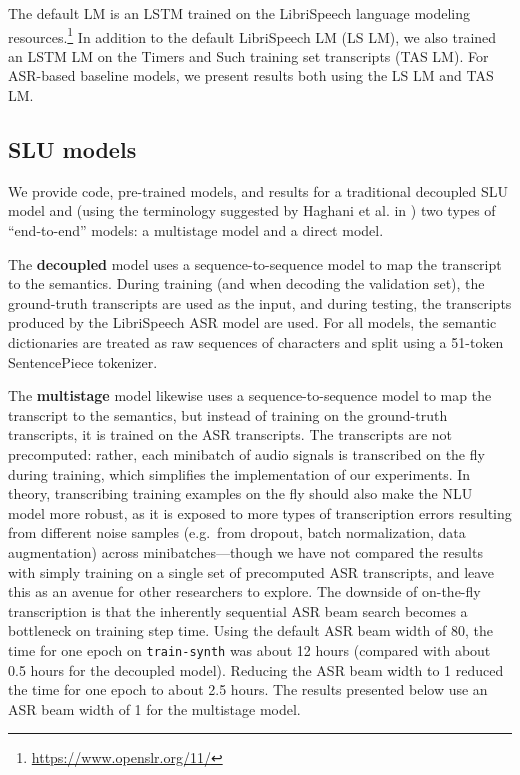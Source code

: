 \documentclass{article}
\begin{document}
The default LM is an LSTM trained on the LibriSpeech language modeling resources.\footnote{\url{https://www.openslr.org/11/}} In addition to the default LibriSpeech LM (LS LM), we also trained an LSTM LM on the Timers and Such training set transcripts (TAS LM). For ASR-based baseline models, we present results both using the LS LM and TAS LM.

\subsection{SLU models}\label{models}

We provide code, pre-trained models, and results for a traditional decoupled SLU model and (using the terminology suggested by Haghani et al. in \cite{Haghani2018}) two types of ``end-to-end'' models: a multistage model and a direct model.

The \textbf{decoupled} model uses a sequence-to-sequence model to map the transcript to the semantics. During training (and when decoding the validation set), the ground-truth transcripts are used as the input, and during testing, the transcripts produced by the LibriSpeech ASR model are used. For all models, the semantic dictionaries are treated as raw sequences of characters and split using a 51-token SentencePiece tokenizer.  

The \textbf{multistage} model likewise uses a sequence-to-sequence model to map the transcript to the semantics, but instead of training on the ground-truth transcripts, it is trained on the ASR transcripts. The transcripts are not precomputed: rather, each minibatch of audio signals is transcribed on the fly during training, which simplifies the implementation of our experiments.
In theory, transcribing training examples on the fly should also make the NLU model more robust, as it is exposed to more types of transcription errors resulting from different noise samples (e.g.~from dropout, batch normalization, data augmentation) across minibatches---though we have not compared the results with simply training on a single set of precomputed ASR transcripts, and leave this as an avenue for other researchers to explore. The downside of on-the-fly transcription is that the inherently sequential ASR beam search becomes a bottleneck on training step time. Using the default ASR beam width of 80, the time for one epoch on \texttt{train-synth} was about 12 hours (compared with about 0.5 hours for the decoupled model). Reducing the ASR beam width to 1 reduced the time for one epoch to about 2.5 hours. The results presented below use an ASR beam width of 1 for the multistage model.
\end{document}
